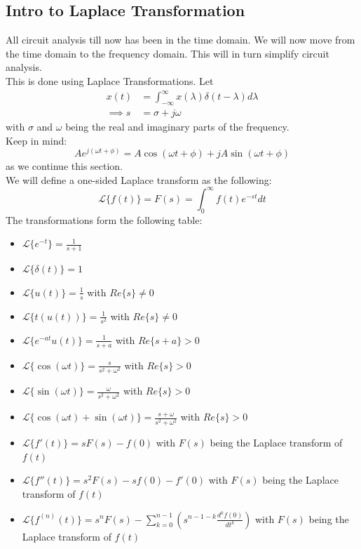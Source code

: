 \documentclass[nobib]{tufte-handout}
\begin{document}
\subsection{Intro to Laplace Transformation}
All circuit analysis till now has been in the time domain. We will now move from the time domain to the frequency domain. This will in turn simplify circuit analysis.\\
This is done using Laplace Transformations.
Let 
\begin{align*}
    x(t) &= \int_{-\infty}^{\infty} x(\lambda)\delta(t-\lambda)d\lambda\\
    \implies s &= \sigma +j\omega
\end{align*}
with $\sigma$ and $\omega$ being the real and imaginary parts of the frequency.\\ Keep in mind:
\begin{equation*}
    Ae^{j(\omega t+\phi)} = A\cos(\omega t+\phi)+jA\sin(\omega t+ \phi)
\end{equation*}
as we continue this section.\\
We will define a one-sided Laplace transform as the following:
\begin{equation*}
    \mathcal{L}\{f(t)\} = F(s) = \int_{0}^{\infty} f(t)e^{-st}dt
\end{equation*}
The transformations form the following table:
\begin{itemize}
    \item $\mathcal{L}\{e^{-t}\} = \frac{1}{s+1}$
    \item $\mathcal{L}\{\delta(t)\} = 1$
    \item $\mathcal{L}\{u(t)\} = \frac{1}{s}$ with $Re\{s\}\neq 0$
    \item $\mathcal{L}\{t(u(t))\} = \frac{1}{s^2}$ with $Re\{s\}\neq 0$
    \item $\mathcal{L}\{e^{-at}u(t)\} = \frac{1}{s+a}$ with $Re\{s+a\}> 0$
    \item $\mathcal{L}\{\cos(\omega t)\} = \frac{s}{s^2+\omega^2}$ with $Re\{s\}> 0$
    \item $\mathcal{L}\{\sin(\omega t)\} = \frac{\omega}{s^2+\omega^2}$ with $Re\{s\}> 0$
    \item $\mathcal{L}\{\cos(\omega t)+\sin(\omega t)\} = \frac{s+\omega}{s^2+\omega^2}$ with $Re\{s\}> 0$
    \item $\mathcal{L}\{f'(t)\} = sF(s) - f(0)$ with $F(s)$ being the Laplace transform of $f(t)$
    \item $\mathcal{L}\{f''(t)\} = s^2F(s) - sf(0)-f'(0)$ with $F(s)$ being the Laplace transform of $f(t)$
    \item $\mathcal{L}\{f^{(n)}(t)\} = s^n F(s) -\sum_{k=0}^{n-1} (s^{n-1-k}\frac{d^k f(0)}{dt^k})$ with $F(s)$ being the Laplace transform of $f(t)$
\end{itemize}
\end{document}
